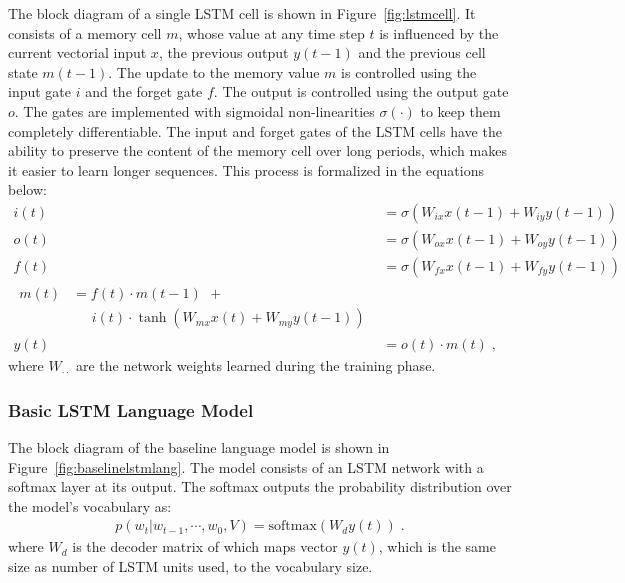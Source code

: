 The block diagram of a single LSTM cell is shown in Figure~\ref{fig:lstmcell}.  
It consists of a memory cell $m$, whose value at any time step $t$ is influenced
by the current vectorial input $x$, the previous output $y(t-1)$ and the
previous cell state $m(t-1)$.
The update to the memory value $m$ is controlled using the input gate $i$ and
the forget gate $f$.
The output is controlled using the output gate $o$. 
The gates are implemented with sigmoidal non-linearities $\sigma(\cdot)$ to keep
them completely differentiable.
The input and forget gates of the LSTM cells have the ability to preserve the
content of the memory cell over long periods, which makes it easier to learn
longer sequences.
This process is formalized in the equations below:
\begin{align}
  \label{eqn:lstmstrt}
  i(t) &= \sigma(W_{ix}x(t-1) + W_{iy}y(t-1))\\
  o(t) &= \sigma(W_{ox}x(t-1) + W_{oy}y(t-1))\\
  f(t) &= \sigma(W_{fx}x(t-1) + W_{fy}y(t-1))\\
  \label{eqn:lstmend}
  \begin{split}
    m(t) &= f(t)\cdot m(t-1) \:\, + \\
    &\; \; \; \; \; i(t)\cdot \tanh(W_{mx}x(t)+W_{my}y(t-1))
  \end{split}\\
  y(t) &= o(t) \cdot m(t) \;,
\end{align}
where $W_{\cdot\cdot}$ are the network weights learned during the
training phase.


\subsubsection{Basic LSTM Language Model}
\label{subsec:basiclstmodel}

The block diagram of the baseline language model is shown in
Figure~\ref{fig:baselinelstmlang}.
The model consists of an LSTM network with a softmax layer at its output. 
The softmax outputs the probability distribution over the model's vocabulary as:
\begin{align}
p(w_t | w_{t-1},\cdots,w_0, V) = \text{softmax}(W_d y(t)) \;.
\end{align}
\noindent where $W_d$ is the decoder matrix of which maps vector $y(t)$, which
is the same size as number of LSTM units used, to the vocabulary size.

